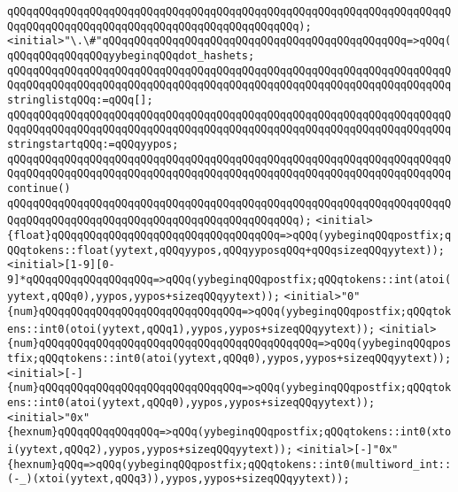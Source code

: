 \verb|qQQqqQQqqQQqqQQqqQQqqQQqqQQqqQQqqQQqqQQqqQQqqQQqqQQqqQQqqQQqqQQqqQQqqQQqqQQqqQQqqQQqqQQqqQQqqQQqqQQqqQQqqQQqqQQqqQQq);|\newline
\newline
\verb|<initial>"\.\#"qQQqqQQqqQQqqQQqqQQqqQQqqQQqqQQqqQQqqQQqqQQqqQQq=>qQQq(qQQqqQQqqQQqqQQqyybeginqQQqdot_hashets;|\newline
\verb|qQQqqQQqqQQqqQQqqQQqqQQqqQQqqQQqqQQqqQQqqQQqqQQqqQQqqQQqqQQqqQQqqQQqqQQqqQQqqQQqqQQqqQQqqQQqqQQqqQQqqQQqqQQqqQQqqQQqqQQqqQQqqQQqqQQqqQQqqQQqstringlistqQQq:=qQQq[];|\newline
\verb|qQQqqQQqqQQqqQQqqQQqqQQqqQQqqQQqqQQqqQQqqQQqqQQqqQQqqQQqqQQqqQQqqQQqqQQqqQQqqQQqqQQqqQQqqQQqqQQqqQQqqQQqqQQqqQQqqQQqqQQqqQQqqQQqqQQqqQQqqQQqstringstartqQQq:=qQQqyypos;|\newline
\verb|qQQqqQQqqQQqqQQqqQQqqQQqqQQqqQQqqQQqqQQqqQQqqQQqqQQqqQQqqQQqqQQqqQQqqQQqqQQqqQQqqQQqqQQqqQQqqQQqqQQqqQQqqQQqqQQqqQQqqQQqqQQqqQQqqQQqqQQqqQQqcontinue()|\newline
\verb|qQQqqQQqqQQqqQQqqQQqqQQqqQQqqQQqqQQqqQQqqQQqqQQqqQQqqQQqqQQqqQQqqQQqqQQqqQQqqQQqqQQqqQQqqQQqqQQqqQQqqQQqqQQqqQQqqQQq);|\newline
\newline
\verb|<initial>{float}qQQqqQQqqQQqqQQqqQQqqQQqqQQqqQQqqQQq=>qQQq(yybeginqQQqpostfix;qQQqtokens::float(yytext,qQQqyypos,qQQqyyposqQQq+qQQqsizeqQQqyytext));|\newline
\verb|<initial>[1-9][0-9]*qQQqqQQqqQQqqQQqqQQq=>qQQq(yybeginqQQqpostfix;qQQqtokens::int(atoi(yytext,qQQq0),yypos,yypos+sizeqQQqyytext));|\newline
\verb|<initial>"0"{num}qQQqqQQqqQQqqQQqqQQqqQQqqQQqqQQq=>qQQq(yybeginqQQqpostfix;qQQqtokens::int0(otoi(yytext,qQQq1),yypos,yypos+sizeqQQqyytext));|\newline
\verb|<initial>{num}qQQqqQQqqQQqqQQqqQQqqQQqqQQqqQQqqQQqqQQqqQQq=>qQQq(yybeginqQQqpostfix;qQQqtokens::int0(atoi(yytext,qQQq0),yypos,yypos+sizeqQQqyytext));|\newline
\verb|<initial>[-]{num}qQQqqQQqqQQqqQQqqQQqqQQqqQQqqQQq=>qQQq(yybeginqQQqpostfix;qQQqtokens::int0(atoi(yytext,qQQq0),yypos,yypos+sizeqQQqyytext));|\newline
\verb|<initial>"0x"{hexnum}qQQqqQQqqQQqqQQq=>qQQq(yybeginqQQqpostfix;qQQqtokens::int0(xtoi(yytext,qQQq2),yypos,yypos+sizeqQQqyytext));|\newline
\verb|<initial>[-]"0x"{hexnum}qQQq=>qQQq(yybeginqQQqpostfix;qQQqtokens::int0(multiword_int::(-_)(xtoi(yytext,qQQq3)),yypos,yypos+sizeqQQqyytext));|\newline
